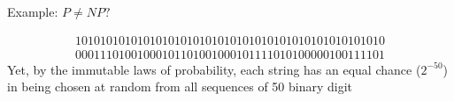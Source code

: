 Example:
$P\neq NP ?$

\begin{align*}
10101010101010101010101010101010101010101010101010\\
00011101001000101101001000101111010100000100111101
\end{align*}
Yet, by the immutable laws of probability, each string has an equal chance ($2^{-50}$) in being chosen at random from all sequences of 50 binary digit


